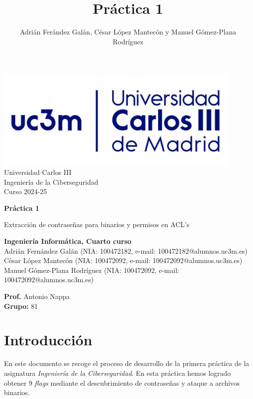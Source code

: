 \documentclass[]{article}
\title{Práctica 1}
\author{Adrián Ferández Galán, César López Mantecón y Manuel Gómez-Plana Rodríguez}
\begin{document}
\begin{titlepage}
    \centering
   \includegraphics[width=0.9\textwidth]{uc3m.jpg} 
    {\Huge Universidad Carlos III\\
    
     \Large Ingeniería de la Ciberseguridad\\
     \vspace{0.5cm}
     Curso 2024-25}
    \vspace{2cm}

    {\Huge \textbf{Práctica 1} \par}
    \vspace{0.5cm}
    {\Large Extracción de contraseñas para binarios y permisos en ACL's\par}
    \vspace{8cm}

   \textbf{Ingeniería Informática, Cuarto curso}\\
    \vspace{0.2cm} 
    Adrián Fernández Galán       (NIA: 100472182, e-mail: 100472182@alumnos.uc3m.es)\\
    César López Mantecón         (NIA: 100472092, e-mail: 100472092@alumnos.uc3m.es)\\
    Manuel Gómez-Plana Rodríguez (NIA: 100472092, e-mail: 100472092@alumnos.uc3m.es)
    \vspace{0.5cm}

   
    \textbf{Prof.} Antonio Nappa\\
    
    \textbf{Grupo: } 81   
    
\end{titlepage}
\newpage


\newpage

\section{Introducción}
\label{sec:introduccion}
En este documento se recoge el proceso de desarrollo de la primera práctica de la asignatura \textit{Ingeniería de la Ciberseguridad}. En esta práctica hemos logrado obtener 9 \textit{flags} mediante el descubrimiento de contraseñas y ataque a archivos binarios. 
\end{document}
